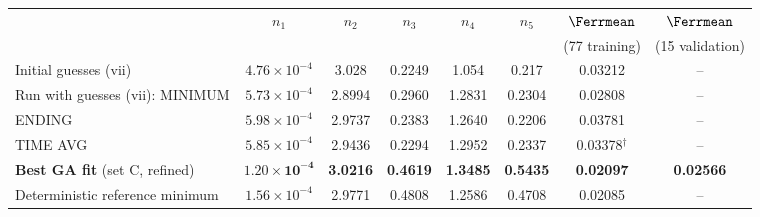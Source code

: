 \begin{tabular}{@{}l c c c c c c c@{}}
\toprule
 & $n_1$ & $n_2$ & $n_3$ & $n_4$ & $n_5$ & $\Ferrmean$ & $\Ferrmean$\\
 & & & & & & (77 training) & (15 validation)\\
\midrule
Initial guesses (vii) & $4.76\times10^{-4}$ & 3.028 & 0.2249 & 1.054 & 0.217 & 0.03212 & --\\
Run with guesses (vii): MINIMUM & $5.73\times10^{-4}$ & 2.8994 & 0.2960 & 1.2831 & 0.2304 & 0.02808 & --\\
\phantom{Run with guesses (vii):} ENDING & $5.98\times10^{-4}$ & 2.9737 & 0.2383 & 1.2640 & 0.2206 & 0.03781 & --\\
\phantom{Run with guesses (vii):} TIME AVG & $5.85\times10^{-4}$ & 2.9436 & 0.2294 & 1.2952 & 0.2337 & 0.03378$^\dagger$ & --\\
\midrule
\textbf{Best GA fit} (set C, refined) & $\mathbf{1.20\times10^{-4}}$ & \textbf{3.0216} & \textbf{0.4619} & \textbf{1.3485} & \textbf{0.5435} & \textbf{0.02097} & \textbf{0.02566}\\
\midrule
Deterministic reference minimum & $1.56\times10^{-4}$ & 2.9771 & 0.4808 & 1.2586 & 0.4708 & 0.02085 & --\\
\bottomrule
\end{tabular}
